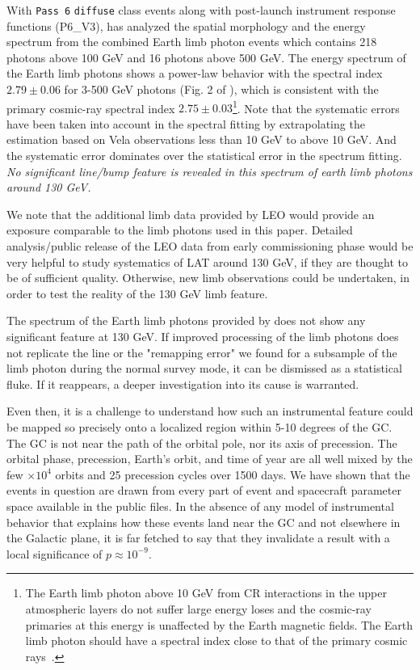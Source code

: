 \documentclass[aps,twocolumn,prd,superscriptaddress,showpacs,nofootinbib,fixfloat]{revtex4}
\begin{document}
With \texttt{Pass 6} \texttt{diffuse} class events along with
post-launch instrument response functions (P6\_V3),
\cite{FermiLimb} has analyzed the spatial morphology and the
energy spectrum from the combined Earth limb photon events
which contains 218 photons above 100 GeV and 16 photons
above 500 GeV. The energy spectrum of the Earth limb photons
shows a power-law behavior with the spectral index $2.79\pm
0.06$ for 3-500 GeV photons (Fig. 2 of \cite{FermiLimb}),
which is consistent with the primary cosmic-ray spectral
index $2.75\pm 0.03$\footnote{The Earth limb photon above 10
  GeV from CR interactions in the upper atmospheric
  layers do not suffer large energy loses and the cosmic-ray
  primaries at this energy is unaffected by the Earth
  magnetic fields. The Earth limb photon should have a
  spectral index close to that of the primary cosmic
  rays~\cite{FermiLimb}. }. Note that the systematic errors
have been taken into account in the spectral fitting by
extrapolating the estimation based on Vela observations less
than 10 GeV to above 10 GeV. And the systematic error
dominates over the statistical error in the spectrum
fitting. \emph{No significant line/bump feature is revealed
  in this spectrum of earth limb photons around 130 GeV.}

We note that the additional limb data provided by LEO would
provide an exposure comparable to the limb photons used in
this paper. Detailed analysis/public release of the LEO data
from early commissioning phase would be very helpful to
study systematics of LAT around 130 GeV, if they are thought
to be of sufficient quality.  Otherwise, new limb
observations could be undertaken, in order to test the
reality of the 130 GeV limb feature.

The spectrum of the Earth limb photons provided by
\citep{FermiLimb} does not show any significant feature at
130 GeV. If improved processing of the limb photons does not
replicate the line or the "remapping error" we found for a
subsample of the limb photon during the normal survey mode,
it can be dismissed as a statistical fluke.  If it
reappears, a deeper investigation into its cause is
warranted.

Even then, it is a challenge to understand how such an
instrumental feature could be mapped so precisely onto a
localized region within 5-10 degrees of the GC.  The GC is
not near the path of the orbital pole, nor its axis of
precession.  The orbital phase, precession, Earth's orbit,
and time of year are all well mixed by the few $\times10^4$
orbits and 25 precession cycles over 1500 days.  We have
shown that the events in question are drawn from every part
of event and spacecraft parameter space available in the
public files.  In the absence of any model of instrumental
behavior that explains how these events land near the GC and
not elsewhere in the Galactic plane, it is far fetched to
say that they invalidate a result with a local significance
of $p\approx10^{-9}$.
\end{document}
